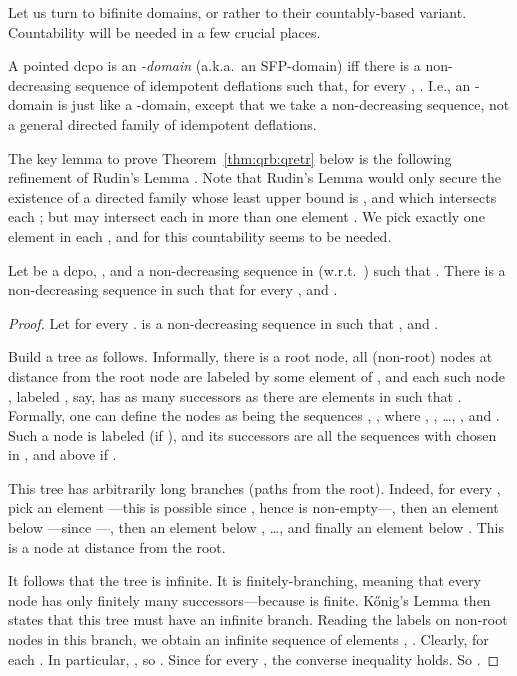 \documentclass{LMCS}
\begin{document}
Let us turn to bifinite domains, or rather to their countably-based
variant.  Countability will be needed in a few crucial places.

A pointed dcpo  is an {\em -domain\/} (a.k.a.\ an
SFP-domain) iff there is a non-decreasing sequence of idempotent
deflations  such that, for every , .  I.e., an -domain is just like a
-domain, except that we take a non-decreasing sequence, not a
general directed family of idempotent deflations.





The key lemma to prove Theorem~\ref{thm:qrb:qretr} below is the
following refinement of Rudin's Lemma \cite[III-3.3]{GHKLMS:contlatt}.
Note that Rudin's Lemma would only secure the existence of a directed
family  whose least upper bound is , and which intersects each
; but  may intersect each  in more than one element
.  We pick exactly one element  in each , and for
this countability seems to be needed.
\begin{lem}
  \label{lemma:qs:nonempty}
  Let  be a dcpo, , and  a
  non-decreasing sequence in  (w.r.t.\ ) such that .
There is a non-decreasing sequence  in 
  such that  for every , and .
\end{lem}
\begin{proof}
  Let  for every .   is a non-decreasing sequence in  such that , and .

  Build a tree as follows.  Informally, there is a root node, all
  (non-root) nodes at distance  from the root node are
  labeled by some element of , and each such node ,
  labeled , say, has as many successors as there are elements
   in  such that .  Formally, one can
  define the nodes as being the sequences ,
  , where , , \ldots, , and .  Such a
  node is labeled  (if ), and its successors are
  all the sequences  with  chosen
  in , and above  if .

  This tree has arbitrarily long branches (paths from the root).
  Indeed, for every , pick an element ---this
  is possible since , hence  is non-empty---,
  then an element  below ---since ---, then an element  below , \ldots, and finally an element  below .  This is a node at distance  from the root.

  It follows that the tree is infinite.  It is finitely-branching,
  meaning that every node has only finitely many successors---because
   is finite.  K\H{o}nig's Lemma then states that this tree must
  have an infinite branch.  Reading the labels on non-root nodes in
  this branch, we obtain an infinite sequence  of elements , .  Clearly,  for each .  In
  particular, , so .  Since  for every ,
  the converse inequality holds.  So .
\end{proof}
\end{document}
